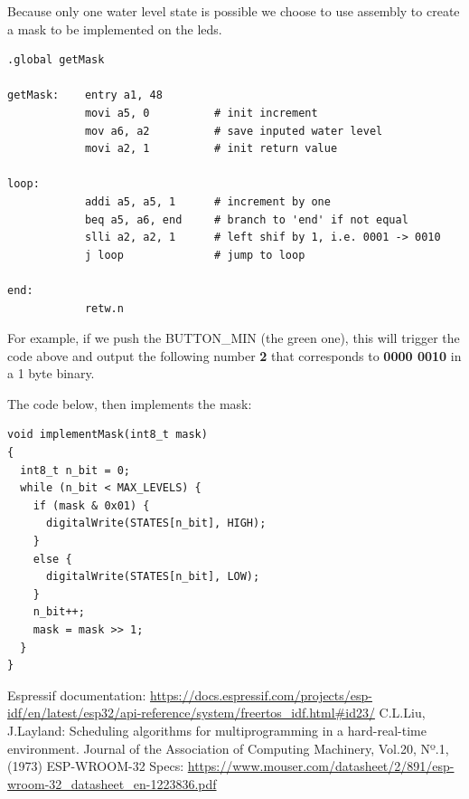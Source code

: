 \documentclass[11pt]{article}
\begin{document}
Because only one water level state is possible we choose to use assembly to create a mask to be implemented on the leds.

\begin{verbatim}
.global getMask

getMask:    entry a1, 48
            movi a5, 0          # init increment
            mov a6, a2          # save inputed water level
            movi a2, 1          # init return value

loop: 
            addi a5, a5, 1      # increment by one
            beq a5, a6, end     # branch to 'end' if not equal
            slli a2, a2, 1      # left shif by 1, i.e. 0001 -> 0010
            j loop              # jump to loop 

end:
            retw.n
\end{verbatim}

For example, if we push the BUTTON\_MIN (the green one), this will trigger the code above and output the following number \textbf{2} that corresponds to \textbf{0000 0010} in a 1 byte binary. 

The code below, then implements the mask:

\begin{verbatim}
void implementMask(int8_t mask)
{
  int8_t n_bit = 0;
  while (n_bit < MAX_LEVELS) {
    if (mask & 0x01) {
      digitalWrite(STATES[n_bit], HIGH);
    }
    else {
      digitalWrite(STATES[n_bit], LOW);
    }
    n_bit++;
    mask = mask >> 1;
  }
}
\end{verbatim}

\newpage
\begin{thebibliography}{8}

 Espressif documentation: {\url{https://docs.espressif.com/projects/esp-idf/en/latest/esp32/api-reference/system/freertos_idf.html#id23/}}
  C.L.Liu, J.Layland: Scheduling algorithms for multiprogramming in a hard-real-time environment. Journal of the Association of Computing Machinery, Vol.20, Nº.1, (1973)
 ESP-WROOM-32 Specs:  {\url{https://www.mouser.com/datasheet/2/891/esp-wroom-32_datasheet_en-1223836.pdf}}

\end{thebibliography}
\end{document}
